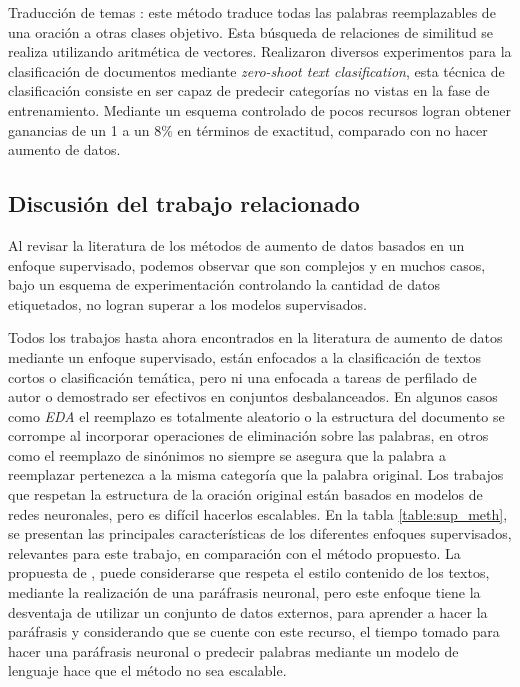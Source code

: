 Traducción de temas \citep{zhang2019integrating}: este método traduce todas las palabras reemplazables de una oración a otras clases objetivo. Esta búsqueda de relaciones de similitud se realiza utilizando aritmética de vectores. Realizaron diversos experimentos para la clasificación de documentos mediante \textit{zero-shoot text clasification}, esta técnica de clasificación consiste en ser capaz de predecir categorías no vistas en la fase de entrenamiento. Mediante un esquema controlado de pocos recursos logran obtener ganancias de un 1 a un 8\% en términos de exactitud, comparado con no hacer aumento de datos.


\subsection{Discusión del trabajo relacionado}

Al revisar la literatura de los métodos de aumento de datos basados en un enfoque supervisado, podemos observar que son complejos y en muchos casos, bajo un esquema de experimentación controlando la cantidad de datos etiquetados, no logran superar a los modelos supervisados.

Todos los trabajos hasta ahora encontrados en la literatura de aumento de datos mediante un enfoque supervisado, están enfocados a la clasificación de textos cortos o clasificación temática, pero ni una enfocada a tareas de perfilado de autor o demostrado ser efectivos en conjuntos desbalanceados. En algunos casos como \textit{EDA} el reemplazo es totalmente aleatorio o la estructura del documento se corrompe al incorporar operaciones de eliminación sobre las palabras, en otros como el reemplazo de sinónimos no siempre se asegura que la palabra a reemplazar pertenezca a la misma categoría que la palabra original. Los trabajos que respetan la estructura de la oración original están basados en modelos de redes neuronales, pero es difícil hacerlos escalables. En la tabla \ref{table:sup_meth}, se presentan las principales características de los diferentes enfoques supervisados, relevantes para este trabajo, en comparación con el método propuesto. La propuesta de \cite{kumar2019submodular}, puede considerarse que respeta el estilo contenido de los textos, mediante la realización de una paráfrasis neuronal, pero este enfoque tiene la desventaja de utilizar un conjunto de datos externos, para aprender a  hacer la paráfrasis y considerando que se cuente con este recurso, el tiempo tomado para hacer una paráfrasis neuronal o predecir palabras mediante un modelo de lenguaje hace que el método no sea escalable.

